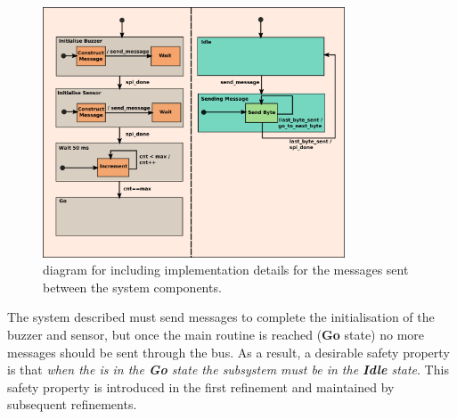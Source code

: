 \begin{figure}[!tbp]
  \begin{centering}
  \includegraphics[width=0.8\textwidth]{figures/ASIC&SPI_2}
  \caption{\Statechart diagram for \IDS including implementation details for the messages sent between the system components.}
  \label{fig:ASIC_SPI_2}
  \end{centering}
\end{figure} 

The system described must send messages to complete the initialisation of the buzzer and sensor, but once the main routine is reached (\textbf{Go} state) no more messages should be sent through the \SPI bus. As a result, a desirable safety property is that \emph{when the \ASIC is in the \textbf{Go} state the \SPI subsystem
must be in the \textbf{Idle} state}.
This safety property is introduced in the first refinement and maintained by subsequent refinements.




